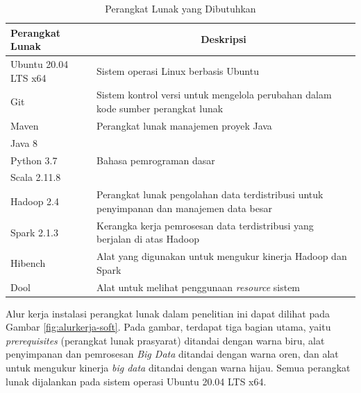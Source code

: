 \begin{table}[h]
	\centering
	\caption{Perangkat Lunak yang Dibutuhkan}
		\begin{tabular}{l p{9cm}} 
		\toprule
			\textbf{Perangkat Lunak} & \multicolumn{1}{c}{\textbf{Deskripsi}}                                                                                \\ 
            \midrule
			Ubuntu 20.04 LTS x64     & Sistem operasi Linux berbasis Ubuntu  \\ 
			Git                      & Sistem kontrol versi untuk mengelola perubahan dalam kode sumber perangkat lunak                                       \\
			Maven                    & Perangkat lunak manajemen proyek Java                            \\ 
			Java 8                   & \multirow{3}{*}{Bahasa pemrograman dasar}                                 \\ 
			Python 3.7               &                                                                                                                        \\
			Scala 2.11.8               &                                                                                                                        \\
			Hadoop 2.4                & Perangkat lunak pengolahan data terdistribusi untuk penyimpanan dan manajemen data besar                               \\ 
			Spark 2.1.3               & Kerangka kerja pemrosesan data terdistribusi yang berjalan di atas Hadoop                                              \\ 
			Hibench   & Alat yang digunakan untuk mengukur kinerja Hadoop dan Spark                                                            \\
			Dool   & Alat untuk melihat penggunaan \textit{resource} sistem                                                             \\
            \bottomrule 
		\end{tabular}
	\label{table:software-needs}
\end{table}


Alur kerja instalasi perangkat lunak dalam penelitian ini dapat dilihat pada Gambar \ref{fig:alurkerja-soft}. Pada gambar, terdapat tiga bagian utama, yaitu \textit{prerequisites} (perangkat lunak prasyarat) ditandai dengan warna biru, alat penyimpanan dan pemrosesan \textit{Big Data} ditandai dengan warna oren, dan alat untuk mengukur kinerja \textit{big data} ditandai dengan warna hijau. Semua perangkat lunak dijalankan pada sistem operasi Ubuntu 20.04 LTS x64.\\

